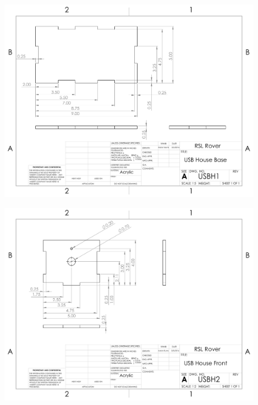 \begin{figure}[H]
	\centerline{\includegraphics[angle=90,width=1.0\linewidth]{dwgs/USBH1.pdf}}
\end{figure}

\begin{figure}[H]
	\centerline{\includegraphics[angle=90,width=1.0\linewidth]{dwgs/USBH2.pdf}}
\end{figure}

